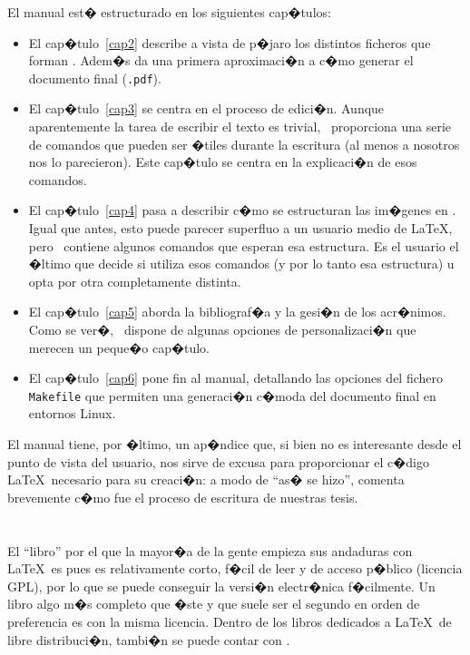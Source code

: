 El manual est� estructurado en los siguientes cap�tulos:

\begin{itemize}
\item El cap�tulo~\ref{cap2} describe a vista de p�jaro los distintos
  ficheros que forman \texis. Adem�s da una primera aproximaci�n
  a c�mo generar el documento final (\texttt{.pdf}).

\item El cap�tulo~\ref{cap3} se centra en el proceso de
  edici�n. Aunque aparentemente la tarea de escribir el texto es
  trivial, \texis\ proporciona una serie de comandos que pueden
  ser �tiles durante la escritura (al menos a nosotros nos lo
  parecieron). Este cap�tulo se centra en la explicaci�n de esos
  comandos.

\item El cap�tulo~\ref{cap4} pasa a describir c�mo se estructuran las
  im�genes en \texis. Igual que antes, esto puede parecer
  superfluo a un usuario medio de \LaTeX, pero \texis\ contiene
  algunos comandos que esperan esa estructura. Es el usuario el �ltimo
  que decide si utiliza esos comandos (y por lo tanto esa estructura)
  u opta por otra completamente distinta.

\item El cap�tulo~\ref{cap5} aborda la bibliograf�a y la gesi�n de los
  acr�nimos. Como se ver�, \texis\ dispone de algunas opciones de
  personalizaci�n que merecen un peque�o cap�tulo.

\item El cap�tulo~\ref{cap6} pone fin al manual, detallando las
  opciones del fichero \texttt{Makefile} que permiten una generaci�n
  c�moda del documento final en entornos Linux.
\end{itemize}

El manual tiene, por �ltimo, un ap�ndice que, si bien no es
interesante desde el punto de vista del usuario, nos sirve de excusa
para proporcionar el c�digo \LaTeX\ necesario para su creaci�n: a modo
de ``as� se hizo'', comenta brevemente c�mo fue el proceso de
escritura de nuestras tesis.


\section*{\NotasBibliograficas}
\TocNotasBibliograficas

El ``libro'' por el que la mayor�a de la gente empieza sus andaduras
con \LaTeX\ es \cite{ldesc2e} pues es relativamente corto, f�cil de
leer y de acceso p�blico (licencia GPL), por lo que se puede
conseguir la versi�n electr�nica f�cilmente. Un libro algo m�s
completo que �ste y que suele ser el segundo en orden de preferencia
es \cite{notsoshort} con la misma licencia. Dentro de los libros
dedicados a \LaTeX\ de libre distribuci�n, tambi�n se puede contar con
\cite{latexAPrimer}.

